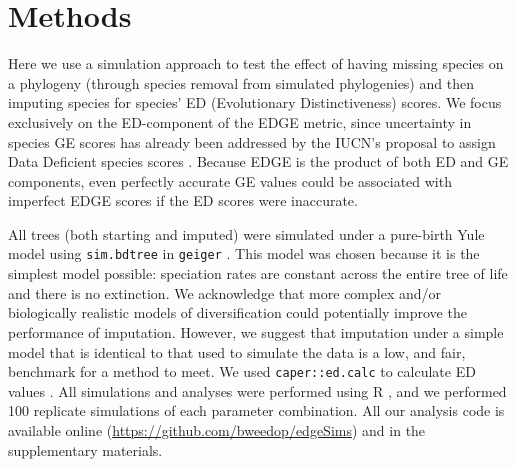 \documentclass[10pt,english]{article}
\begin{document}
\section*{Methods}

Here we use a simulation approach to test the effect of having missing species
on a phylogeny (through species removal from simulated phylogenies) and then
imputing species for species’ ED (Evolutionary Distinctiveness) scores. We focus
exclusively on the ED-component of the EDGE metric, since uncertainty in species
GE scores has already been addressed by the IUCN’s proposal to assign Data
Deficient species scores \autocite{Iucn2001, Iucn2008}. Because EDGE is the
product of both ED and GE components, even perfectly accurate GE values could be
associated with imperfect EDGE scores if the ED scores were inaccurate.


All trees (both starting and imputed) were simulated under a pure-birth Yule
model using \texttt{sim.bdtree} in \texttt{geiger} \autocite[setting parameters
\texttt{b=1} and \texttt{d=0};][]{Pennell2014}. This model was chosen because it
is the simplest model possible: speciation rates are constant across the entire
tree of life and there is no extinction. We acknowledge that more complex and/or
biologically realistic models of diversification could potentially improve the
performance of imputation. However, we suggest that imputation under a simple
model that is identical to that used to simulate the data is a low, and fair,
benchmark for a method to meet. We used \texttt{caper::ed.calc} to calculate ED
values \autocite{Orme2013}. All simulations and analyses were performed using R
\autocite[version 3.4.0;][]{R2017}, and we performed 100 replicate simulations
of each parameter combination. All our analysis code is available online
(\url{https://github.com/bweedop/edgeSims}) and in the supplementary materials.
\end{document}
